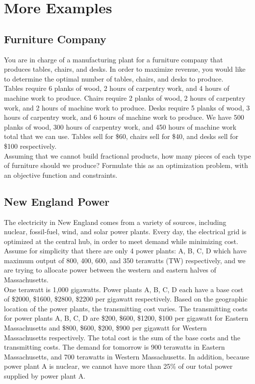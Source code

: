 \documentclass[12pt]{article}
\begin{document}
\section{More Examples}

\subsection{Furniture Company}
You are in charge of a manufacturing plant for a furniture company that produces tables, chairs, and desks.  
In order to maximize revenue, you would like to determine the optimal number of tables, chairs, and desks to produce.  \\

Tables require 6 planks of wood, 2 hours of carpentry work, and 4 hours of machine work to produce.  Chairs require 2 planks of wood, 2 hours of carpentry work, and 2 hours of machine work to produce.  Desks require 5 planks of wood, 3 hours of carpentry work, and 6 hours of machine work to produce.  We have 500 planks of wood, 300 hours of carpentry work, and 450 hours of machine work total that we can use.  Tables sell for \$60, chairs sell for \$40, and desks sell for \$100 respectively.  \\

Assuming that we cannot build fractional products, how many pieces of each type of furniture should we produce?  Formulate this as an optimization problem, with an objective function and constraints.  

\subsection{New England Power}
The electricity in New England comes from a variety of sources, including nuclear, fossil-fuel, wind, and solar power plants.  
Every day, the electrical grid is optimized at the central hub, in order to meet demand while minimizing cost.  Assume for simplicity that there are only 4 power plants: A, B, C, D which have maximum output of 800, 400, 600, and 350 terawatts (TW) respectively, and we are trying to allocate power between the western and eastern halves of Massachusetts.  \\

One terawatt is 1,000 gigawatts.  Power plants A, B, C, D each have a base cost of \$2000, \$1600, \$2800, \$2200 per gigawatt respectively.  Based on the geographic location of the power plants, the transmitting cost varies.  The transmitting costs for power plants A, B, C, D are \$200, \$600, \$1200, \$100 per gigawatt for Eastern Massachusetts and \$800, \$600, \$200, \$900 per gigawatt for Western Massachusetts respectively.  The total cost is the sum of the base costs and the transmitting costs.  The demand for tomorrow is 900 terawatts in Eastern Massachusetts, and 700 terawatts in Western Massachusetts.   In addition, because power plant A is nuclear, we cannot have more than 25\% of our total power supplied by power plant A.  \\
\end{document}
